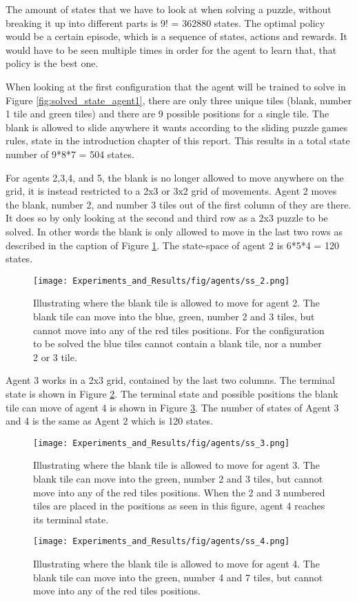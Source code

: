 \noindent The amount of states that we have to look at when solving a puzzle, without breaking it up into different parts is 9! = 362880 states. The optimal policy would be a certain episode, which is a sequence of states, actions and rewards. It would have to be seen multiple times in order for the agent to learn that, that policy is the best one.

When looking at the first configuration that the agent will be trained to solve in Figure \ref{fig:solved_state_agent1}, there are only three unique tiles (blank, number 1 tile and green tiles) and there are 9 possible positions for a single tile. The blank is allowed to slide anywhere it wants according to the sliding puzzle games rules, state in the introduction chapter of this report. This results in a total state number of 9*8*7 = 504 states.

For agents 2,3,4, and 5, the blank is no longer allowed to move anywhere on the grid, it is instead restricted to a 2x3 or 3x2 grid of movements.
Agent 2 moves the blank, number 2, and  number 3 tiles out of the first column of they are there. It does so by only looking at the second and third row as a 2x3 puzzle to be solved. In other words the blank is only allowed to move in the last two rows as described in the caption of Figure \ref{fig:agent2}. The state-space of agent 2 is 6*5*4 = 120 states.
\begin{figure}[!htb]
	\centering
	\texttt{[image: Experiments\_and\_Results/fig/agents/ss\_2.png]}
	\caption{Illustrating where the blank tile is allowed to move for agent 2. The blank tile can move into the blue, green, number 2 and 3 tiles, but cannot move into any of the red tiles positions. For the configuration to be solved the blue tiles cannot contain a blank tile, nor a number 2 or 3 tile.}
	\label{fig:agent2}
\end{figure}
Agent 3 works in a 2x3 grid, contained by the last two columns. The terminal state is shown in Figure \ref{fig:agent3}. The terminal state and possible positions the blank tile can move of agent 4 is shown in Figure \ref{fig:agent4}. The number of states of Agent 3 and 4 is the same as Agent 2 which is 120 states.
\begin{figure}[!htb]
	\centering
	\texttt{[image: Experiments\_and\_Results/fig/agents/ss\_3.png]}
	\caption{Illustrating where the blank tile is allowed to move for agent 3. The blank tile can move into the green, number 2 and 3 tiles, but cannot move into any of the red tiles positions. When the 2 and 3 numbered tiles are placed in the positions as seen in this figure, agent 4 reaches its terminal state.}
	\label{fig:agent3}
\end{figure}
\begin{figure}[!htb]
	\centering
	\texttt{[image: Experiments\_and\_Results/fig/agents/ss\_4.png]}
	\caption{Illustrating where the blank tile is allowed to move for agent 4. The blank tile can move into the green, number 4 and 7 tiles, but cannot move into any of the red tiles positions.}
	\label{fig:agent4}
\end{figure}

